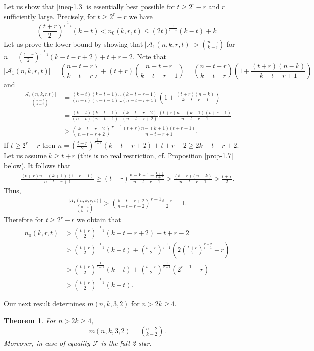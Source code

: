 \documentclass[11pt,a4paper]{article}
\newtheorem{thm}{Theorem}[section]
\newtheorem{false statement}{False statement}
\theoremstyle{definition}
\def\hf{\mathcal{F}}
\def\ha{\mathcal{A}}
\begin{document}
Let us show that \eqref{ineq-1.3} is essentially  best possible for $t\geq  2^r-r$ and $r$ sufficiently large. Precisely,  for $t\geq 2^r-r$ we have
\[
\left(\frac{t+r}{2}\right)^{\frac{1}{r-1}}(k-t)<n_0(k,r,t) \leq  \left(2t\right)^{\frac{1}{r-1}}(k-t)+k.
\]
Let us prove the lower bound by showing that $|\ha_1(n,k,r,t)|>\binom{n-t}{k-t}$ for $n=\left(\frac{t+r}{2}\right)^{\frac{1}{r-1}}(k-t-r+2)+t+r-2$.
Note that
\[
|\ha_1(n,k,r,t)| = \binom{n-t-r}{k-t-r}+(t+r) \binom{n-t-r}{k-t-r+1}=  \binom{n-t-r}{k-t-r}\left(1+\frac{(t+r)(n-k)}{k-t-r+1}\right)
\]
and
\begin{align*}
\frac{|\ha_1(n,k,r,t)|}{\binom{n-t}{k-t}} &= \frac{(k-t)(k-t-1)\ldots(k-t-r+1)}{(n-t)(n-t-1)\ldots(n-t-r+1)}\left(1+\frac{(t+r)(n-k)}{k-t-r+1}\right)\\[3pt]
&= \frac{(k-t)(k-t-1)\ldots(k-t-r+2)}{(n-t)(n-t-1)\ldots(n-t-r+2)} \frac{(t+r)n-(k+1)(t+r-1)}{n-t-r+1}\\[3pt]
&> \left(\frac{k-t-r+2}{n-t-r+2}\right)^{r-1} \frac{(t+r)n-(k+1)(t+r-1)}{n-t-r+1}.
\end{align*}
If $t\geq 2^r-r$ then $n= \left(\frac{t+r}{2}\right)^{\frac{1}{r-1}}(k-t-r+2)+t+r-2\geq 2k-t-r+2$.
Let us assume $k\geq t+r$  (this is no real restriction, cf. Proposition \ref{prop-1.7} below). It follows that
\begin{align*}
\frac{(t+r)n-(k+1)(t+r-1)}{n-t-r+1} \geq (t+r) \frac{n-k-1+\frac{k+1}{t+r}}{n-t-r+1}> \frac{(t+r)(n-k)}{n-t-r+1}>\frac{t+r}{2}.
\end{align*}
Thus,
\begin{align*}
\frac{|\ha_1(n,k,r,t)|}{\binom{n-t}{k-t}} > \left(\frac{k-t-r+2}{n-t-r+2}\right)^{r-1} \frac{t+r}{2}= 1.
\end{align*}
Therefore for $t\geq 2^r-r$ we obtain that
\begin{align*}
n_0(k,r,t)&> \left(\frac{t+r}{2}\right)^{\frac{1}{r-1}}(k-t-r+2)+t+r-2 \\[3pt]
&> \left(\frac{t+r}{2}\right)^{\frac{1}{r-1}}(k-t)+ \left(\frac{t+r}{2}\right)^{\frac{1}{r-1}}\left(2\left(\frac{t+r}{2}\right)^{\frac{r-2}{r-1}}-r\right)\\[3pt]
&> \left(\frac{t+r}{2}\right)^{\frac{1}{r-1}}(k-t)+ \left(\frac{t+r}{2}\right)^{\frac{1}{r-1}}\left(2^{r-1}-r\right)\\[3pt]
&> \left(\frac{t+r}{2}\right)^{\frac{1}{r-1}}(k-t).
\end{align*}

Our next result determines $m(n,k,3,2)$ for $n> 2k\geq 4$.


\begin{thm}\label{thm:main-2}
For $n> 2k\geq 4$,
\begin{align}\label{ineq-thm-2}
m(n,k,3,2) =\binom{n-2}{k-2}.
\end{align}
Moreover, in case of equality $\hf$ is the full 2-star.
\end{thm}
\end{document}
